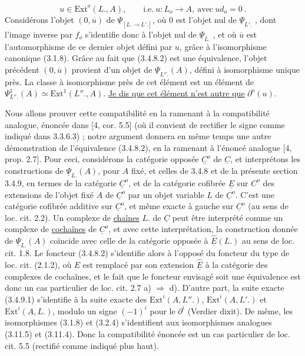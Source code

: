 \begin{equation*}
u \in \mathrm{Ext}^o(L.,A), \qquad \mathrm{i.e.} \ u : L_o \longrightarrow A, \ \mathrm{avec} \ ud_o = 0 \ .
\end{equation*}
Considérons l'objet $(0,\overline{u})$ de $\underline{\Psi}_{[L. \to L'.]}$, où $0$ est l'objet nul de $\underline{\Psi}_{L'.}$ , dont l'image inverse par $f_o$ s'identifie donc à l'objet nul de $\underline{\Psi}_{L.}$ , et où $\overline{u}$ est l'automorphisme de ce dernier objet défini par $u$, grâce à l'isomorphisme canonique (3.1.8). Grâce au fait que (3.4.8.2) est une équivalence, l'objet précédent $(0,\overline{u})$ provient d'un objet de $\underline{\Psi}_{L''.}(A)$, défini à isomorphisme unique près. La classe à isomorphisme près de cet élément est un élément de $\Psi^1_{L''.}(A) \simeq \mathrm{Ext}^1(L''.,A)$. \underline{Je dis que cet élément n'est autre que} $\partial^o(u)$.

Nous allons prouver cette compatibilité en la ramenant à la compatibilité analogue, énoncée dans [4, cor. 5.5] (où il convient de rectifier le signe comme indiqué dans 3.3.6.3) ; notre argument donnera en même temps une autre démonstration de l'équivalence (3.4.8.2), en la ramenant à l'énoncé analogue [4, prop. 2.7]. Pour ceci, considérons la catégorie opposée $\underline{C}^o$ de $\underline{C}$, et interprétons les constructions de $\underline{\Psi}_{L.}(A)$, pour $A$ fixé, et celles de 3.4.8 et de la présente section 3.4.9, en termes de la catégorie $\underline{C}^o$, et de la catégorie cofibrée $\underline{E}$ sur $C^o$ des extensions de l'objet fixé $A$ de $\underline{C}^o$ par un objet variable $L$ de $\underline{C}^o$. C'est une catégorie cofibrée additive sur $\underline{C}^o$, et même exacte à gauche sur $\underline{C}^o$ (au sens de loc. cit. 2.2). Un complexe de \underline{chaînes} $L.$ de $\underline{C}$ peut être interprété  comme
un complexe de \underline{cochaînes} de $\underline{C}^o$, et avec cette interprétation, la construction donnée de $\underline{\Psi}_{L.}(A)$ coïncide avec celle de la catégorie opposée à $\underline{\hat{E}}(L.)$ au sens de loc. cit. 1.8. Le foncteur (3.4.8.2) s'identifie alors à l'opposé du foncteur du type de loc. cit. (2.1.2), où $E$ est remplacé par son extension $\underline{\hat{E}}$ à la catégorie des complexes de cochaînes, et le fait que le foncteur envisagé soit une équivalence est donc un cas particulier de loc. cit. 2.7 a) $\Longrightarrow$ d). D'autre part, la suite exacte (3.4.9.1) s'identifie à la suite exacte des $\mathrm{Ext}^i(A,L''.)$, $\mathrm{Ext}^i(A,L'.)$ et $\mathrm{Ext}^i(A,L.)$, modulo un signe $(-1)^i$ pour le $\partial^i$ (Verdier dixit). De même, les isomorphismes (3.1.8) et (3.2.4) s'identifient aux isomorphismes analogues (3.11.5) et (3.11.4). Donc la compatibilité énoncée est un cas particulier de loc. cit. 5.5 (rectifié comme indiqué plus haut).


